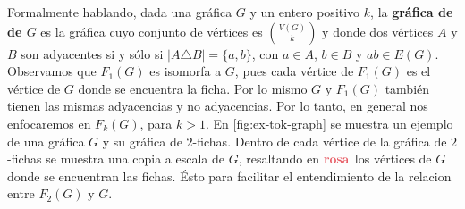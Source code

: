 Formalmente hablando, dada una gr\'afica $G$ y un entero positivo $k$, la
\textbf{gr\'afica de}  \textbf{de
$G$} es la gr\'afica cuyo conjunto de v\'ertices es
$\binom{V(G)}{k}$ y donde dos v\'ertices $A$ y $B$ son adyacentes si y s\'olo si
$|A \triangle B| = \{a,b\}$, con $a \in A$, $b \in B$ y $ab \in E(G)$.
Observamos que $F_1(G)$ es isomorfa a $G$, pues cada v\'ertice de $F_1(G)$ es el
v\'ertice de $G$ donde se encuentra la ficha. Por lo mismo $G$ y $F_1(G)$
tambi\'en tienen las mismas adyacencias y no adyacencias. Por lo tanto, en
general nos enfocaremos en $F_k(G)$, para $k > 1$. En
\cref{fig:ex-tok-graph} se muestra un ejemplo de una gr\'afica $G$ y su
gr\'afica de $2$-fichas. Dentro de cada v\'ertice de la gr\'afica de $2$-fichas
se muestra una copia a escala de $G$, resaltando en ${\color{rosa}\bf rosa}$ los
v\'ertices de $G$ donde se encuentran las fichas. \'Esto para facilitar el
entendimiento de la relacion entre $F_2(G)$ y $G$.

